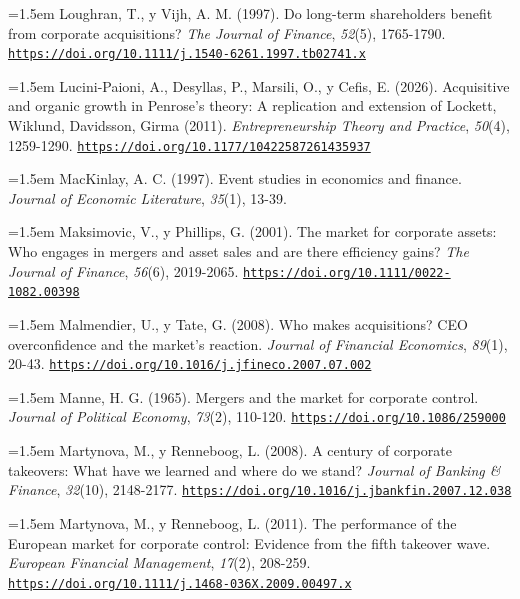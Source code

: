 \documentclass[10pt,a4paper]{article}
\begin{document}
\noindent\hangindent=1.5em Loughran, T., y Vijh, A. M. (1997). Do long-term shareholders benefit from corporate acquisitions? \textit{The Journal of Finance}, \textit{52}(5), 1765-1790. \href{https://doi.org/10.1111/j.1540-6261.1997.tb02741.x}{\nolinkurl{https://doi.org/10.1111/j.1540-6261.1997.tb02741.x}}

\noindent\hangindent=1.5em Lucini-Paioni, A., Desyllas, P., Marsili, O., y Cefis, E. (2026). Acquisitive and organic growth in Penrose's theory: A replication and extension of Lockett, Wiklund, Davidsson, Girma (2011). \textit{Entrepreneurship Theory and Practice}, \textit{50}(4), 1259-1290. \href{https://doi.org/10.1177/10422587261435937}{\nolinkurl{https://doi.org/10.1177/10422587261435937}}

\noindent\hangindent=1.5em MacKinlay, A. C. (1997). Event studies in economics and finance. \textit{Journal of Economic Literature}, \textit{35}(1), 13-39.

\noindent\hangindent=1.5em Maksimovic, V., y Phillips, G. (2001). The market for corporate assets: Who engages in mergers and asset sales and are there efficiency gains? \textit{The Journal of Finance}, \textit{56}(6), 2019-2065. \href{https://doi.org/10.1111/0022-1082.00398}{\nolinkurl{https://doi.org/10.1111/0022-1082.00398}}

\noindent\hangindent=1.5em Malmendier, U., y Tate, G. (2008). Who makes acquisitions? CEO overconfidence and the market's reaction. \textit{Journal of Financial Economics}, \textit{89}(1), 20-43. \href{https://doi.org/10.1016/j.jfineco.2007.07.002}{\nolinkurl{https://doi.org/10.1016/j.jfineco.2007.07.002}}

\noindent\hangindent=1.5em Manne, H. G. (1965). Mergers and the market for corporate control. \textit{Journal of Political Economy}, \textit{73}(2), 110-120. \href{https://doi.org/10.1086/259000}{\nolinkurl{https://doi.org/10.1086/259000}}

\noindent\hangindent=1.5em Martynova, M., y Renneboog, L. (2008). A century of corporate takeovers: What have we learned and where do we stand? \textit{Journal of Banking \& Finance}, \textit{32}(10), 2148-2177. \href{https://doi.org/10.1016/j.jbankfin.2007.12.038}{\nolinkurl{https://doi.org/10.1016/j.jbankfin.2007.12.038}}

\noindent\hangindent=1.5em Martynova, M., y Renneboog, L. (2011). The performance of the European market for corporate control: Evidence from the fifth takeover wave. \textit{European Financial Management}, \textit{17}(2), 208-259. \href{https://doi.org/10.1111/j.1468-036X.2009.00497.x}{\nolinkurl{https://doi.org/10.1111/j.1468-036X.2009.00497.x}}
\end{document}

